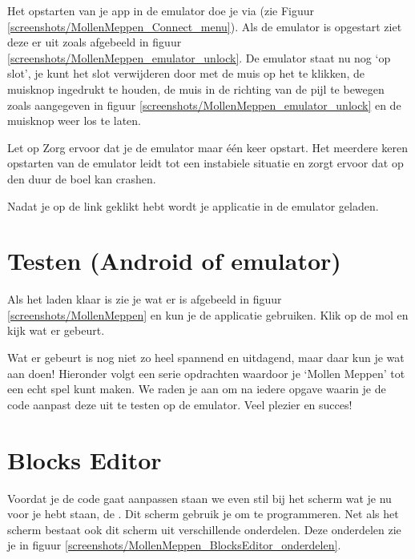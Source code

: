 Het opstarten van je app in de emulator doe je via  (zie Figuur \ref{screenshots/MollenMeppen_Connect_menu}).
Als de emulator is opgestart ziet deze er uit zoals afgebeeld in figuur \ref{screenshots/MollenMeppen_emulator_unlock}. De emulator staat nu nog `op slot', je kunt het slot verwijderen door met de muis op het  te klikken, de muisknop ingedrukt te houden, de muis in de richting van de pijl te bewegen zoals aangegeven in figuur \ref{screenshots/MollenMeppen_emulator_unlock} en de muisknop weer los te laten.

\begin{derivation}{Let op}
Zorg ervoor dat je de emulator maar \'e\'en keer opstart. Het meerdere keren opstarten van de emulator leidt tot een instabiele situatie en zorgt ervoor dat op den duur de boel kan crashen.
\end{derivation}




Nadat je op de link geklikt hebt wordt je applicatie in de emulator geladen. 


\section{Testen (Android of emulator)}
Als het laden klaar is zie je wat er is afgebeeld in figuur \ref{screenshots/MollenMeppen} en kun je de applicatie gebruiken. Klik op de mol en kijk wat er gebeurt.
 
Wat er gebeurt is nog niet zo heel spannend en uitdagend, maar daar kun je wat aan doen! Hieronder volgt een serie opdrachten waardoor je `Mollen Meppen' tot een echt spel kunt maken. We raden je aan om na iedere opgave waarin je de code aanpast deze uit te testen op de emulator. Veel plezier en succes!

\section{Blocks Editor}
Voordat je de code gaat aanpassen staan we even stil bij het scherm wat je nu voor je hebt staan, de . Dit scherm gebruik je om te programmeren. Net als het  scherm bestaat ook dit scherm uit verschillende onderdelen. Deze onderdelen zie je in figuur \ref{screenshots/MollenMeppen_BlocksEditor_onderdelen}.

